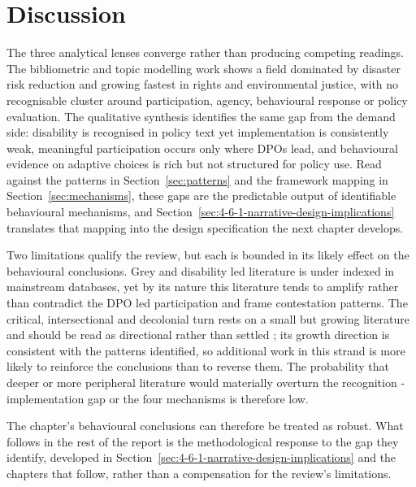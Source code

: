 \documentclass[12pt,a4paper]{report}
\begin{document}
\section{Discussion}
The three analytical lenses converge rather than producing competing readings. The bibliometric and topic modelling work shows a field dominated by disaster risk reduction and growing fastest in rights and environmental justice, with no recognisable cluster around participation, agency, behavioural response or policy evaluation. The qualitative synthesis identifies the same gap from the demand side: disability is recognised in policy text yet implementation is consistently weak, meaningful participation occurs only where DPOs lead, and behavioural evidence on adaptive choices is rich but not structured for policy use. Read against the patterns in Section~\ref{sec:patterns} and the framework mapping in Section~\ref{sec:mechanisms}, these gaps are the predictable output of identifiable behavioural mechanisms, and Section~\ref{sec:4-6-1-narrative-design-implications} translates that mapping into the design specification the next chapter develops.

Two limitations qualify the review, but each is bounded in its likely effect on the behavioural conclusions. Grey and disability led literature is under indexed in mainstream databases, yet by its nature this literature tends to amplify rather than contradict the DPO led participation and frame contestation patterns. The critical, intersectional and decolonial turn rests on a small but growing literature and should be read as directional rather than settled \cite{stjernholm2025critical,eriksen2025rock,setijaningrum2024tokenism}; its growth direction is consistent with the patterns identified, so additional work in this strand is more likely to reinforce the conclusions than to reverse them. The probability that deeper or more peripheral literature would materially overturn the recognition - implementation gap or the four mechanisms is therefore low.

The chapter's behavioural conclusions can therefore be treated as robust. What follows in the rest of the report is the methodological response to the gap they identify, developed in Section~\ref{sec:4-6-1-narrative-design-implications} and the chapters that follow, rather than a compensation for the review's limitations.


\end{document}
